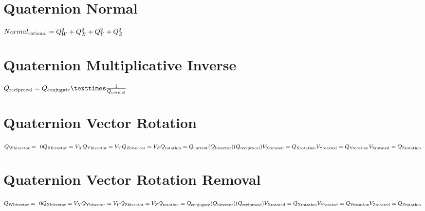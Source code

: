 \documentclass{article}
\begin{document}
\section{Quaternion Normal}
$
Normal_\textrm{rational} = Q_W^2 + Q_X^2 + Q_Y^2 + Q_Z^2 \newline
$


\section{Quaternion Multiplicative Inverse}
$
Q_\textrm{reciprocal} = Q_\textrm{conjugate} × \frac{1}{Q_\textrm{normal}} \newline
\newline
\newline
\newline
\newline
\newline
\newline
\newline
\newline
$


\section{Quaternion Vector Rotation}
$
Q_\textrm{Wbivector} =\hspace{1ex} 0 \newline
Q_\textrm{Xbivector} = V_X \newline
Q_\textrm{Ybivector} = V_Y \newline
Q_\textrm{Zbivector} = V_Z \newline
\newline
Q_\textrm{rotation} = Q_\textrm{current}(Q_\textrm{bivector})(Q_\textrm{reciprocal}) \newline
\newline
V_\textrm{Xrotated} = Q_\textrm{Xrotation} \newline
V_\textrm{Yrotated} = Q_\textrm{Yrotation} \newline
V_\textrm{Zrotated} = Q_\textrm{Zrotation} \newline
$


\section{Quaternion Vector Rotation Removal}
$
Q_\textrm{Wbivector} =\hspace{1ex} 0 \newline
Q_\textrm{Xbivector} = V_X \newline
Q_\textrm{Ybivector} = V_Y \newline
Q_\textrm{Zbivector} = V_Z \newline
\newline
Q_\textrm{rotation} = Q_\textrm{conjugate}(Q_\textrm{bivector})(Q_\textrm{reciprocal}) \newline
\newline
V_\textrm{Xrotated} = Q_\textrm{Xrotation} \newline
V_\textrm{Yrotated} = Q_\textrm{Yrotation} \newline
V_\textrm{Zrotated} = Q_\textrm{Zrotation} \newline
$
\end{document}
